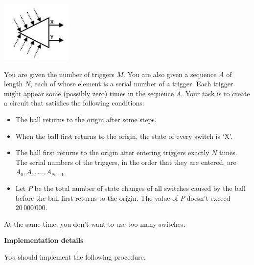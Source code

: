 \includegraphics{3.png}

You are given the number of triggers $M$. You are also given a sequence $A$ of length $N$,
each of whose element is a serial number of a trigger. Each trigger might appear some
(possibly zero) times in the sequence $A$. Your task is to create a circuit that satisfies
the following conditions:

\begin{itemize}
    \item The ball returns to the origin after some steps.
    \item When the ball first returns to the origin, the state of every switch is `X'.
    \item The ball first returns to the origin after entering triggers exactly $N$ times. The
serial numbers of the triggers, in the order that they are entered, are $A_0,A_1,\ldots,A_{N-1}$.
    \item Let $P$ be the total number of state changes of all switches caused by the ball
before the ball first returns to the origin. The value of $P$ doesn't exceed $20\,000\,000$.
\end{itemize}

At the same time, you don't want to use too many switches.

\textbf{Implementation details}

You should implement the following procedure.

